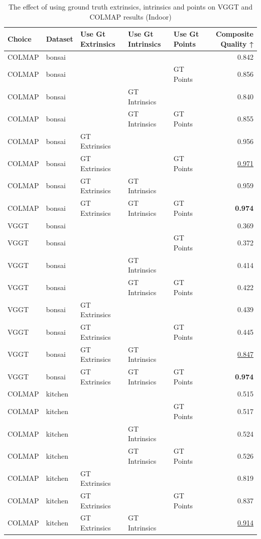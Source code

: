 \begin{table}[H]
\caption{\ifdefined\customcaption \customcaption \else The effect of using ground truth extrinsics, intrinsics and points on VGGT and COLMAP results (Indoor) \fi}
\label{tab:06_gt_cams_indoor}
\centering
\scriptsize
\begin{tabular}{lllllr}
\toprule
Choice & Dataset & Use Gt Extrinsics & Use Gt Intrinsics & Use Gt Points & Composite Quality ↑ \\
\midrule
COLMAP & bonsai &  &  &  & 0.842 \\
COLMAP & bonsai &  &  & GT Points & 0.856 \\
COLMAP & bonsai &  & GT Intrinsics &  & 0.840 \\
COLMAP & bonsai &  & GT Intrinsics & GT Points & 0.855 \\
COLMAP & bonsai & GT Extrinsics &  &  & 0.956 \\
COLMAP & bonsai & GT Extrinsics &  & GT Points & \underline{0.971} \\
COLMAP & bonsai & GT Extrinsics & GT Intrinsics &  & 0.959 \\
COLMAP & bonsai & GT Extrinsics & GT Intrinsics & GT Points & \textbf{0.974} \\
\midrule
VGGT & bonsai &  &  &  & 0.369 \\
VGGT & bonsai &  &  & GT Points & 0.372 \\
VGGT & bonsai &  & GT Intrinsics &  & 0.414 \\
VGGT & bonsai &  & GT Intrinsics & GT Points & 0.422 \\
VGGT & bonsai & GT Extrinsics &  &  & 0.439 \\
VGGT & bonsai & GT Extrinsics &  & GT Points & 0.445 \\
VGGT & bonsai & GT Extrinsics & GT Intrinsics &  & \underline{0.847} \\
VGGT & bonsai & GT Extrinsics & GT Intrinsics & GT Points & \textbf{0.974} \\
\midrule
COLMAP & kitchen &  &  &  & 0.515 \\
COLMAP & kitchen &  &  & GT Points & 0.517 \\
COLMAP & kitchen &  & GT Intrinsics &  & 0.524 \\
COLMAP & kitchen &  & GT Intrinsics & GT Points & 0.526 \\
COLMAP & kitchen & GT Extrinsics &  &  & 0.819 \\
COLMAP & kitchen & GT Extrinsics &  & GT Points & 0.837 \\
COLMAP & kitchen & GT Extrinsics & GT Intrinsics &  & \underline{0.914} \\

\end{tabular}
\end{table}
